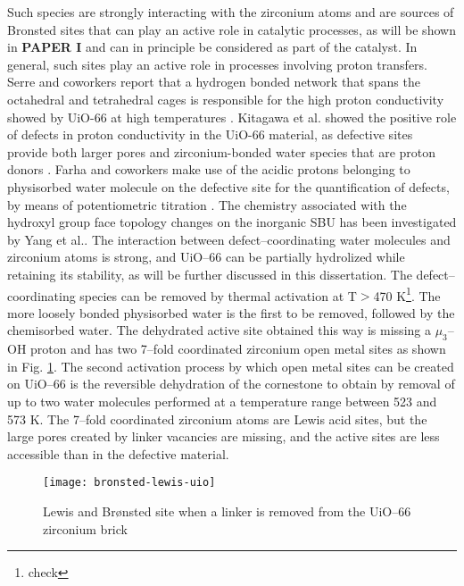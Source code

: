 Such species are strongly interacting with the zirconium atoms and are sources of Bronsted sites that can play an active role in catalytic processes, as will be shown in \textbf{PAPER I} and can in principle be considered as part of the catalyst.
In general, such sites play an active role in processes involving proton transfers. Serre and coworkers report that a hydrogen bonded network that spans the octahedral and tetrahedral cages is responsible for the high proton conductivity showed by UiO-66 at high temperatures \cite{borges2016proton}. Kitagawa et al. showed the positive role of defects in proton conductivity in the UiO-66 material, as defective sites provide both larger pores and zirconium-bonded water species that are proton donors \cite{taylor2015defect}. Farha and coworkers make use of the acidic protons belonging to physisorbed water molecule on the defective site for the quantification of defects, by means of potentiometric titration \cite{klet2016evaluation}. The chemistry associated with the hydroxyl group face topology changes on the inorganic SBU has been investigated by Yang et al.\cite{yang2016tuning}. The interaction between defect--coordinating water molecules and zirconium atoms is strong, and UiO--66 can be partially hydrolized\cite{decoste2013stability} while retaining its stability, as will be further discussed in this dissertation.
The defect--coordinating species can be removed by thermal activation at T$>$470 K\footnote{check}. The more loosely bonded physisorbed water is the first to be removed, followed by the chemisorbed water. The dehydrated active site obtained this way is missing a $\mu_{3}$--OH proton and has two 7--fold coordinated zirconium open metal sites as shown in Fig. \ref{fig:bronsted-lewis-uio}. 
The second activation process by which open metal sites can be created on UiO--66 is the reversible dehydration of the  cornestone to obtain  by removal of up to two water molecules performed at a temperature range between 523 and 573 K. The 7--fold coordinated zirconium atoms are Lewis acid sites, but the large pores created by linker vacancies are missing, and the active sites are less accessible than in the defective material. 
\begin{figure}[!htbp]
	\centering
 	\texttt{[image: bronsted-lewis-uio]}
	\caption{Lewis and Br\o{}nsted site when a linker is removed from the UiO--66 zirconium brick}
	\label{fig:bronsted-lewis-uio}
\end{figure}
